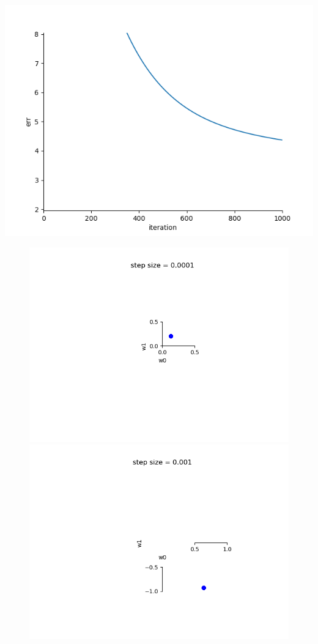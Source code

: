 \documentclass[12pt]{article}
\begin{document}


\includegraphics[width=\linewidth]{./assets/201805301419.png}
\pagebreak
\begin{figure}[h!]
\centering
\includegraphics[width=.45\linewidth]{./assets/201805301420.png}
\centering
\includegraphics[width=.45\linewidth]{./assets/201805301421.png}
\end{figure}
\end{document}
